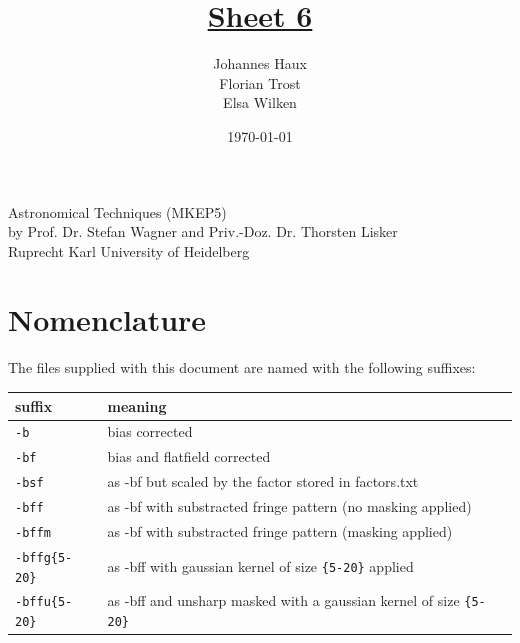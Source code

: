 \documentclass[11pt,a4paper,twoside]{article}
\title{\LARGE \underline {Sheet 6}}
\author{Johannes Haux \\ Florian Trost \\ Elsa Wilken}
\date{\today}
\begin{document}
\maketitle
\thispagestyle{empty}

\begin{center}
  Astronomical Techniques (MKEP5) \\
  \baselineskip35pt
  by Prof. Dr. Stefan Wagner and Priv.-Doz. Dr. Thorsten Lisker \\
  \baselineskip60pt
  Ruprecht Karl University of Heidelberg
\vskip 40pt

\end{center}

\newpage
\setcounter{page}{1}		%

\section*{Nomenclature}
The files supplied with this document are named with the following suffixes:
\begin{table}[h!]
\begin{tabular}{ll}\toprule
suffix          & meaning \\ \midrule
\verb+-b+       & bias corrected \\
\verb+-bf+      & bias and flatfield corrected	\\
\verb+-bsf+     & as -bf but scaled by the factor stored in factors.txt	\\
\verb+-bff+     & as -bf with substracted fringe pattern (no masking applied)	\\
\verb+-bffm+    & as -bf with substracted fringe pattern (masking applied)	\\
\verb+-bffg{5-20}+    & as -bff with gaussian kernel of size \verb+{5-20}+ applied	\\
\verb+-bffu{5-20}+    & as -bff and unsharp masked with a gaussian kernel of size \verb+{5-20}+	\\
\bottomrule
\end{tabular}
\end{table}
\end{document}
